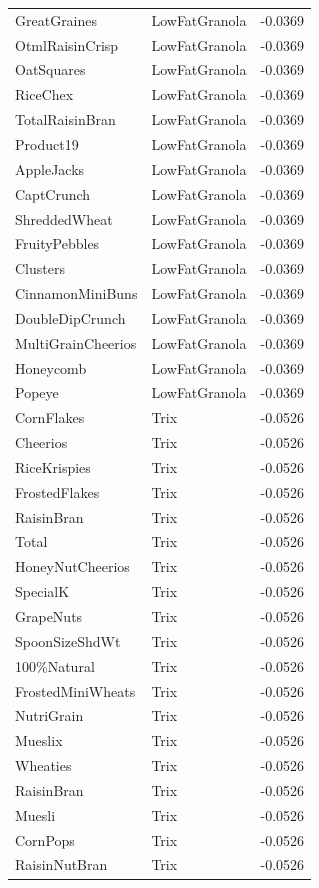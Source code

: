 \begin{table}[!htbp]
\begin{tabular}{lll}
GreatGraines & LowFatGranola & -0.0369
\\
OtmlRaisinCrisp & LowFatGranola & -0.0369
\\
OatSquares & LowFatGranola & -0.0369
\\
RiceChex & LowFatGranola & -0.0369
\\
TotalRaisinBran & LowFatGranola & -0.0369
\\
Product19 & LowFatGranola & -0.0369
\\
AppleJacks & LowFatGranola & -0.0369
\\
CaptCrunch & LowFatGranola & -0.0369
\\
ShreddedWheat & LowFatGranola & -0.0369
\\
FruityPebbles & LowFatGranola & -0.0369
\\
Clusters & LowFatGranola & -0.0369
\\
CinnamonMiniBuns & LowFatGranola & -0.0369
\\
DoubleDipCrunch & LowFatGranola & -0.0369
\\
MultiGrainCheerios & LowFatGranola & -0.0369
\\
Honeycomb & LowFatGranola & -0.0369
\\
Popeye & LowFatGranola & -0.0369
\\
CornFlakes & Trix & -0.0526
\\
Cheerios & Trix & -0.0526
\\
RiceKrispies & Trix & -0.0526
\\
FrostedFlakes & Trix & -0.0526
\\
RaisinBran & Trix & -0.0526
\\
Total & Trix & -0.0526
\\
HoneyNutCheerios & Trix & -0.0526
\\
SpecialK & Trix & -0.0526
\\
GrapeNuts & Trix & -0.0526
\\
SpoonSizeShdWt & Trix & -0.0526
\\
100\%Natural & Trix & -0.0526
\\
FrostedMiniWheats & Trix & -0.0526
\\
NutriGrain & Trix & -0.0526
\\
Mueslix & Trix & -0.0526
\\
Wheaties & Trix & -0.0526
\\
RaisinBran & Trix & -0.0526
\\
Muesli & Trix & -0.0526
\\
CornPops & Trix & -0.0526
\\
RaisinNutBran & Trix & -0.0526

\end{tabular}
\end{table}
